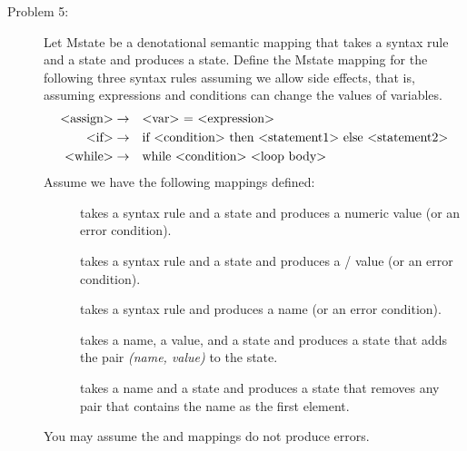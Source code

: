 \documentclass{article}
\begin{document}
\begin{description}
\item[Problem 5:] Let Mstate be a denotational semantic mapping that takes a syntax rule and a state and
produces a state. Define the Mstate mapping for the following three syntax rules assuming we allow side
effects, that is, assuming expressions and conditions can change the values of variables.
\begin{align*}
\bnf{<assign>} \rightarrow\quad 	&\bnf{<var> = <expression>}\\
\text{$<$if$>$}     \rightarrow\quad 	&\text{if $<$condition$>$ then $<$statement1$>$ else $<$statement2$>$}\\
\text{$<$while$>$}  \rightarrow\quad 	&\text{while $<$condition$>$ $<$loop body$>$}
\end{align*}
Assume we have the following mappings defined:
\begin{description}
\item[] takes a syntax rule and a state and produces a numeric value (or an error condition).
\item[] takes a syntax rule and a state and produces a  /  value (or an error condition).
\item[] takes a syntax rule and produces a name (or an error condition).
\item[] takes a name, a value, and a state and produces a state that adds the pair {\it(name, value)} to the state.
\item[] takes a name and a state and produces a state that removes any pair that contains the name as the
first element.\end{description}
You may assume the  and  mappings do not produce errors.
\end{description}
\end{document}
